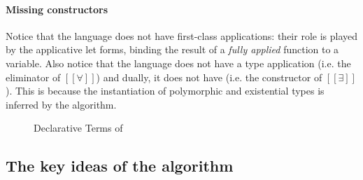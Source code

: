 \paragraph{Missing constructors}
Notice that the language does not have first-class applications: 
their role is played by the applicative let forms, binding 
the result of a \emph{fully applied} function to a variable.
Also notice that the language does not have a type application 
(i.e. the eliminator of $[[∀]]$) and dually, 
it does not have \pack (i.e. the constructor of $[[∃]]$).
This is because the instantiation of polymorphic and existential 
types is inferred by the algorithm.  

\begin{figure}[h]
  \begin{multicols}{2}
    \ottgrammartabular{
      \ottc\ottinterrule
    }

    \ottgrammartabular{
      \ottv\ottinterrule
    }
  \end{multicols}
  \caption{Declarative Terms of \fexists}
  \label{fig:declarative-terms}
\end{figure}

\subsection{The key ideas of the algorithm}

